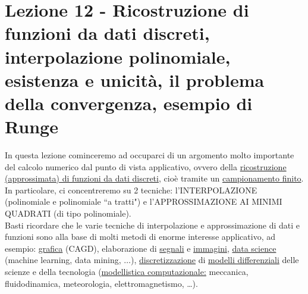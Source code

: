 \documentclass[12pt,headings=optiontohead]{article}
\begin{document}
\section[Lezione 12 - Interpolazione polinomiale]{Lezione 12 - Ricostruzione di funzioni da dati discreti, interpolazione polinomiale, esistenza e unicità, il problema della convergenza, esempio di Runge}

In questa lezione cominceremo ad occuparci di un argomento molto importante del calcolo numerico dal punto di vista applicativo, ovvero della \uline{ricostruzione (approssimata) di funzioni da dati discreti}, cioè tramite un \uline{campionamento finito}.\\
In particolare, ci concentreremo su 2 tecniche: l'INTERPOLAZIONE (polinomiale e polinomiale ``a tratti") e l'APPROSSIMAZIONE AI MINIMI QUADRATI (di tipo polinomiale).\\
Basti ricordare che le varie tecniche di interpolazione e approssimazione di dati e funzioni sono alla base di molti metodi di enorme interesse applicativo, ad esempio: \uline{grafica} (CAGD), elaborazione di \uline{segnali} e \uline{immagini}, \uline{data science} (machine learning, data mining, $\dotsc$), \uline{discretizzazione} di \uline{modelli differenziali} delle scienze e della tecnologia (\uline{modellistica computazionale:} meccanica, fluidodinamica, meteorologia, elettromagnetismo, \dots).
\end{document}
